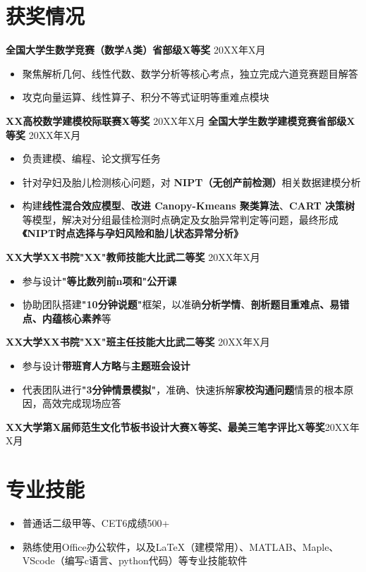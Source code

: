 	\section{\makebox[\widthof{\faGraduationCap}][c]{\color{WHU_Blue}{\faTrophy}}\quad 获奖情况}
	\textbf{全国大学生数学竞赛（数学A类）省部级X等奖} \hfill 20XX年X月%
	\begin{itemize}
		\item 聚焦解析几何、线性代数、数学分析等核心考点，独立完成六道竞赛题目解答
		\item 攻克向量运算、线性算子、积分不等式证明等重难点模块
	\end{itemize}
	\textbf{XX高校数学建模校际联赛X等奖} \hfill 20XX年X月\newline
	\textbf{全国大学生数学建模竞赛省部级X等奖} \hfill 20XX年X月
	\begin{itemize}
		\item 负责建模、编程、论文撰写任务
		\item 针对孕妇及胎儿检测核心问题，对 \textbf{NIPT（无创产前检测）}相关数据建模分析
		\item 构建\textbf{线性混合效应模型}、\textbf{改进 Canopy-Kmeans 聚类算法}、\textbf{CART 决策树}等模型，解决对分组最佳检测时点确定及女胎异常判定等问题，最终形成\textbf{《NIPT时点选择与孕妇风险和胎儿状态异常分析》}
	\end{itemize}
	\textbf{XX大学XX书院"XX"教师技能大比武二等奖} \hfill 20XX年X月%
	\begin{itemize}
		\item 参与设计\textbf{"等比数列前n项和"公开课}
		\item 协助团队搭建\textbf{"10分钟说题"}框架，以准确\textbf{分析学情}、\textbf{剖析题目重难点、易错点、内蕴核心素养}等
	\end{itemize}
	\textbf{XX大学XX书院"XX"班主任技能大比武二等奖} \hfill 20XX年X月%
	\begin{itemize}
		\item 参与设计\textbf{带班育人方略}与\textbf{主题班会设计}
		\item 代表团队进行\textbf{"3分钟情景模拟"}，准确、快速拆解\textbf{家校沟通问题}情景的根本原因，高效完成现场应答
	\end{itemize}
	\textbf{XX大学第X届师范生文化节\textbf{板书设计大赛X等奖}、\textbf{最美三笔字评比X等奖}}\hfill 20XX年X月
	\vspace*{-8pt}
	\section{\makebox[\widthof{\faGraduationCap}][c]{\color{WHU_Blue}{\faWrench}}\quad 专业技能}
	\begin{itemize}
		\item 普通话二级甲等、CET6成绩500+
		\item 熟练使用Office办公软件，以及LaTeX（建模常用）、MATLAB、Maple、VScode（编写c语言、python代码）等专业技能软件
	\end{itemize}
